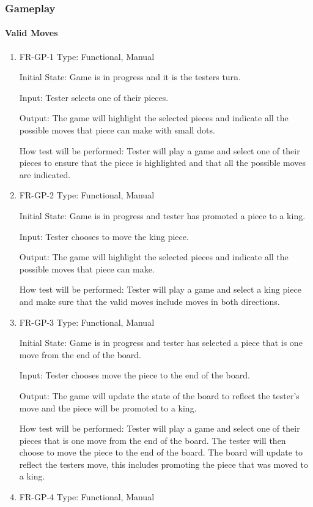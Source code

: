 \documentclass[12pt, titlepage]{article}
\begin{document}
\subsubsection{Gameplay}
\paragraph{Valid Moves}
\begin{enumerate}
    \item{FR-GP-1}
    Type: Functional, Manual
    
    Initial State: Game is in progress and it is the testers turn.
    					
    Input: Tester selects one of their pieces.
    					
    Output: The game will highlight the selected pieces and indicate all the possible moves that piece can make with small dots.
    					
    How test will be performed: Tester will play a game and select one of their pieces to ensure that the piece is highlighted and that all the possible moves are indicated.
    \item{FR-GP-2}
    Type: Functional, Manual
    
    Initial State: Game is in progress and tester has promoted a piece to a king.
    					
    Input: Tester chooses to move the king piece.
    					
    Output: The game will highlight the selected pieces and indicate all the possible moves that piece can make.
    					
    How test will be performed: Tester will play a game and select a king piece and make sure that the valid moves include moves in both directions.
    \item{FR-GP-3} 
    Type: Functional, Manual
    
    Initial State: Game is in progress and tester has selected a piece that is one move from the end of the board.
    					
    Input: Tester chooses move the piece to the end of the board.
    					
    Output: The game will update the state of the board to reflect the tester's move and the piece will be promoted to a king.
    					
    How test will be performed: Tester will play a game and select one of their pieces that is one move from the end of the board. The tester will then choose to move the piece to the end of the board. The board will update to reflect the testers move, this includes promoting the piece that was moved to a king.
    \item{FR-GP-4} 
    Type: Functional, Manual
    

\end{enumerate}
\end{document}
